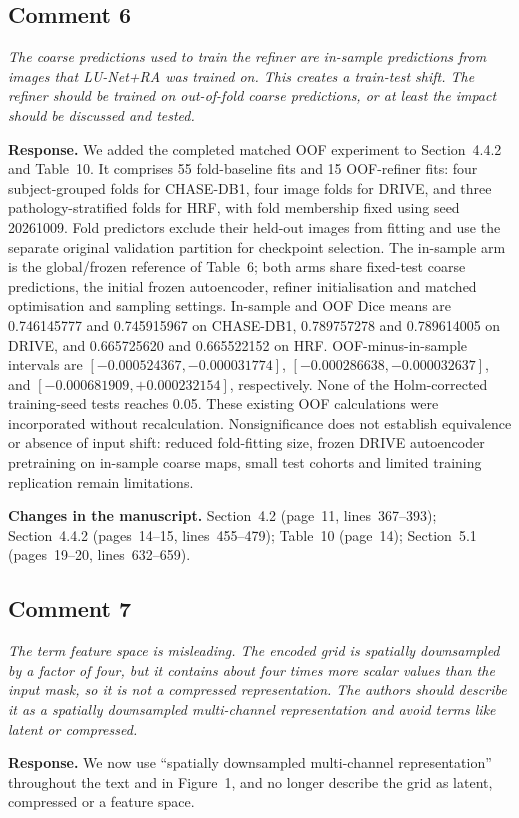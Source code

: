 \documentclass[11pt,a4paper]{article}
\newenvironment{revcomment}{\par\medskip\noindent\begin{minipage}{\linewidth}\itshape}{\end{minipage}\par\smallskip}
\begin{document}
\subsection*{Comment 6}
\begin{revcomment}The coarse predictions used to train the refiner are in-sample predictions from images that LU-Net+RA was trained on. This creates a train-test shift. The refiner should be trained on out-of-fold coarse predictions, or at least the impact should be discussed and tested.\end{revcomment}
\textbf{Response.} We added the completed matched OOF experiment to Section~4.4.2 and Table~10. It comprises 55 fold-baseline fits and 15 OOF-refiner fits: four subject-grouped folds for CHASE-DB1, four image folds for DRIVE, and three pathology-stratified folds for HRF, with fold membership fixed using seed 20261009. Fold predictors exclude their held-out images from fitting and use the separate original validation partition for checkpoint selection. The in-sample arm is the global/frozen reference of Table~6; both arms share fixed-test coarse predictions, the initial frozen autoencoder, refiner initialisation and matched optimisation and sampling settings. In-sample and OOF Dice means are 0.746145777 and 0.745915967 on CHASE-DB1, 0.789757278 and 0.789614005 on DRIVE, and 0.665725620 and 0.665522152 on HRF. OOF-minus-in-sample intervals are $[-0.000524367,-0.000031774]$, $[-0.000286638,-0.000032637]$, and $[-0.000681909,+0.000232154]$, respectively. None of the Holm-corrected training-seed tests reaches 0.05. These existing OOF calculations were incorporated without recalculation. Nonsignificance does not establish equivalence or absence of input shift: reduced fold-fitting size, frozen DRIVE autoencoder pretraining on in-sample coarse maps, small test cohorts and limited training replication remain limitations.

\textbf{Changes in the manuscript.} Section~4.2 (page~11, lines~367--393); Section~4.4.2 (pages~14--15, lines~455--479); Table~10 (page~14); Section~5.1 (pages~19--20, lines~632--659).

\subsection*{Comment 7}
\begin{revcomment}The term feature space is misleading. The encoded grid is spatially downsampled by a factor of four, but it contains about four times more scalar values than the input mask, so it is not a compressed representation. The authors should describe it as a spatially downsampled multi-channel representation and avoid terms like latent or compressed.\end{revcomment}
\textbf{Response.} We now use ``spatially downsampled multi-channel representation'' throughout the text and in Figure~1, and no longer describe the grid as latent, compressed or a feature space.
\end{document}

